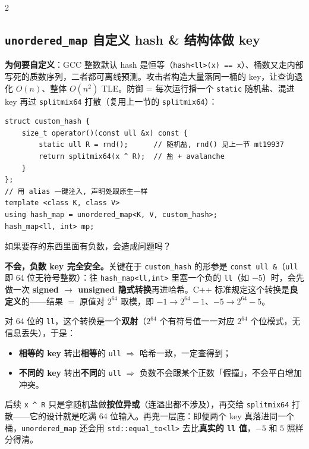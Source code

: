 \begin{multicols*}{2}
		\subsection{\texttt{unordered\_map} 自定义 hash \& 结构体做 key}

		\textbf{为何要自定义}：GCC 整数默认 hash 是恒等（\texttt{hash<ll>(x) == x}）、桶数又走内部写死的质数序列，二者都可离线预测。攻击者构造大量落同一桶的 key，让查询退化 $O(n)$、整体 $O(n^2)$ TLE。防御 = 每次运行播一个 \texttt{static} 随机盐、混进 key 再过 \texttt{splitmix64} 打散（复用上一节的 \texttt{splitmix64}）：

		\begin{verbatim}
struct custom_hash {
	size_t operator()(const ull &x) const {
		static ull R = rnd();      // 随机盐, rnd() 见上一节 mt19937
		return splitmix64(x ^ R);  // 盐 + avalanche
	}
};
// 用 alias 一键注入, 声明处跟原生一样
template <class K, class V>
using hash_map = unordered_map<K, V, custom_hash>;
hash_map<ll, int> mp;
		\end{verbatim}

		\begin{me}
如果要存的东西里面有负数，会造成问题吗？
		\end{me}

		\begin{mentor}
\textbf{不会，负数 key 完全安全。}关键在于 \texttt{custom\_hash} 的形参是 \texttt{const ull \&}（\texttt{ull} 即 64 位无符号整数）：往 \texttt{hash\_map<ll,int>} 里塞一个负的 \texttt{ll}（如 \(-5\)）时，会先做一次 \textbf{signed \(\to\) unsigned 隐式转换}再进哈希。C++ 标准规定这个转换是\textbf{良定义}的——结果 \(=\) 原值对 \(2^{64}\) 取模，即 \(-1 \to 2^{64}-1\)、\(-5 \to 2^{64}-5\)。

对 64 位的 \texttt{ll}，这个转换是一个\textbf{双射}（\(2^{64}\) 个有符号值一一对应 \(2^{64}\) 个位模式，无信息丢失），于是：

\begin{itemize}
  \item \textbf{相等的 key} 转出\textbf{相等}的 \texttt{ull} \(\Rightarrow\) 哈希一致，一定查得到；
  \item \textbf{不同的 key} 转出\textbf{不同}的 \texttt{ull} \(\Rightarrow\) 负数不会跟某个正数「假撞」，不会平白增加冲突。
\end{itemize}

后续 \texttt{x \^{} R} 只是拿随机盐做\textbf{按位异或}（连溢出都不涉及），再交给 \texttt{splitmix64} 打散——它的设计就是吃满 64 位输入。再兜一层底：即便两个 key 真落进同一个桶，\texttt{unordered\_map} 还会用 \texttt{std::equal\_to<ll>} 去比\textbf{真实的 \texttt{ll} 值}，\(-5\) 和 \(5\) 照样分得清。


\end{mentor}
\end{multicols*}
